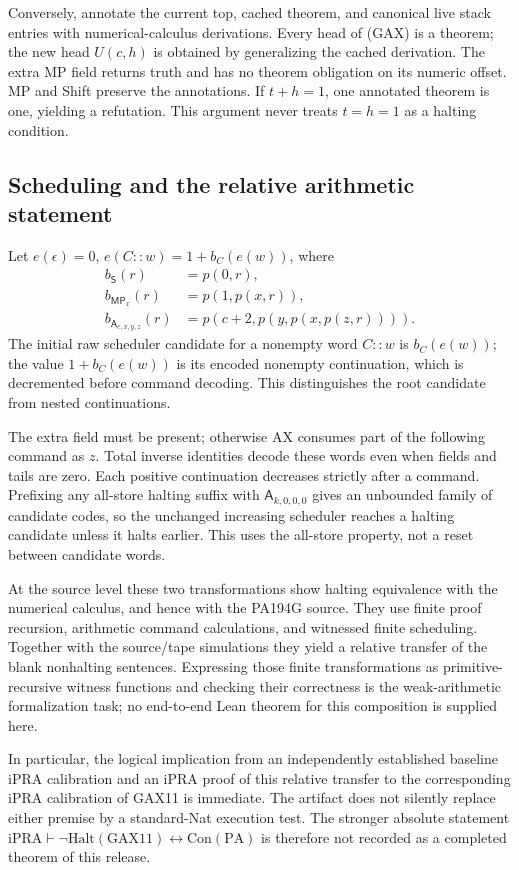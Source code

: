 Conversely, annotate the current top, cached theorem, and canonical
live stack entries with numerical-calculus derivations. Every head of
(GAX) is a theorem; the new head $U(c,h)$ is obtained by generalizing
the cached derivation. The extra MP field returns truth and has no
theorem obligation on its numeric offset. MP and Shift preserve the
annotations. If $t+h=1$, one annotated theorem is one, yielding a
refutation. This argument never treats $t=h=1$ as a halting condition.

\subsection{Scheduling and the relative arithmetic statement}

Let $e(\epsilon)=0$, $e(C::w)=1+b_C(e(w))$, where
\begin{align*}
 b_{\mathsf S}(r)&=p(0,r),\\
 b_{\mathsf{MP}_x}(r)&=p(1,p(x,r)),\\
 b_{\mathsf A_{c,x,y,z}}(r)&=p(c+2,p(y,p(x,p(z,r)))).
\end{align*}
The initial raw scheduler candidate for a nonempty word $C::w$ is
$b_C(e(w))$; the value $1+b_C(e(w))$ is its encoded nonempty
continuation, which is decremented before command decoding. This
distinguishes the root candidate from nested continuations.

The extra field must be present; otherwise AX consumes part of the
following command as $z$. Total inverse identities decode these words
even when fields and tails are zero. Each positive continuation decreases
strictly after a command. Prefixing any all-store halting suffix with
$\mathsf A_{k,0,0,0}$ gives an unbounded family of candidate codes, so
the unchanged increasing scheduler reaches a halting candidate unless
it halts earlier. This uses the all-store property, not a reset between
candidate words.

At the source level these two transformations show halting equivalence
with the numerical calculus, and hence with the PA194G source. They use
finite proof recursion, arithmetic command calculations, and witnessed
finite scheduling. Together with the source/tape simulations they yield
a relative transfer of the blank nonhalting sentences. Expressing those
finite transformations as primitive-recursive witness functions and
checking their correctness is the weak-arithmetic formalization task;
no end-to-end Lean theorem for this composition is supplied here.

In particular, the logical implication from an independently established
baseline iPRA calibration and an iPRA proof of this relative transfer to
the corresponding iPRA calibration of GAX11 is immediate. The artifact
does not silently replace either premise by a standard-Nat execution
test. The stronger absolute statement
$\mathrm{iPRA}\vdash\neg\mathrm{Halt}(\mathrm{GAX11})
\leftrightarrow\mathrm{Con}(\mathrm{PA})$
is therefore not recorded as a completed theorem of this release.

